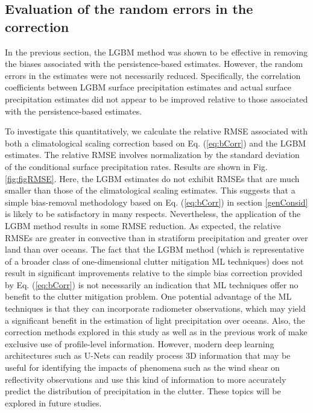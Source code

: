 \documentclass{ametsocV6.1} %
\begin{document}
\subsection{Evaluation of the random errors in the correction}

In the previous section, the LGBM method was shown to be effective in removing the biases associated with the persistence-based estimates. However, the random errors in the estimates were not necessarily reduced. Specifically, the correlation coefficients between LGBM surface precipitation estimates and actual surface precipitation estimates did not appear to be improved relative to those associated with the persistence-based estimates. 

To investigate this quantitatively, we calculate the relative RMSE associated with both a climatological scaling correction based on Eq. (\ref{eq:bCorr}) and the LGBM estimates. The relative RMSE involves normalization by the standard deviation of the conditional surface precipitation rates.  Results are shown in Fig. \ref{fig:figRMSE}.  Here, the LGBM estimates do not exhibit RMSEs that are much smaller than those of the climatological scaling estimates. This suggests that a simple bias-removal methodology based on Eq. (\ref{eq:bCorr}) in section \ref{genConsid} is likely to be satisfactory in many respects. Nevertheless, the application of the LGBM method results in some RMSE reduction. As expected, the relative RMSEs are greater in convective than in stratiform precipitation and greater over land than over oceans. The fact that the LGBM method (which is representative of a broader class of one-dimensional clutter mitigation ML techniques) does not result in significant improvements relative to the simple bias correction provided by Eq. (\ref{eq:bCorr}) is not necessarily an indication that ML techniques offer no benefit to the clutter mitigation problem. One potential advantage of the ML techniques is that they can incorporate radiometer observations, which may yield a significant benefit in the estimation of light precipitation over oceans. Also, the correction methods explored in this study as well as in the previous work of \cite{hirose2021} make exclusive use of profile-level information.  However, modern deep learning architectures such as U-Nets \citep{siddique2021u} can readily process 3D information that may be useful for identifying the impacts of phenomena such as the wind shear on reflectivity observations and use this kind of information to more accurately predict the distribution of precipitation in the clutter. These topics will be explored in future studies.
\end{document}
